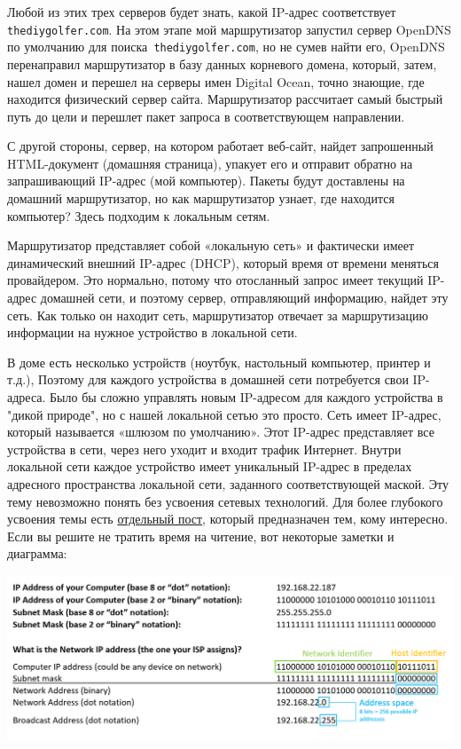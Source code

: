 \documentclass{report}
\begin{document}
Любой из этих трех серверов будет знать, какой IP-адрес соответствует
\texttt{thediygolfer.com}. На этом этапе мой маршрутизатор запустил
сервер OpenDNS по умолчанию для поиска\texttt{\ thediygolfer.com}, но не
сумев найти его, OpenDNS перенаправил маршрутизатор в базу данных
корневого домена, который, затем, нашел домен и перешел на серверы имен
Digital Ocean, точно знающие, где находится физический сервер сайта.
Маршрутизатор рассчитает самый быстрый путь до цели и перешлет пакет
запроса в соответствующем направлении.

С другой стороны, сервер, на котором работает веб-сайт, найдет
запрошенный HTML-документ (домашняя страница), упакует его и отправит
обратно на запрашивающий IP-адрес (мой компьютер). Пакеты будут
доставлены на домашний маршрутизатор, но как маршрутизатор узнает, где
находится компьютер? Здесь подходим к локальным сетям.

Маршрутизатор представляет собой «локальную сеть» и фактически имеет
динамический внешний IP-адрес (DHCP), который время от времени меняться
провайдером. Это нормально, потому что отосланный запрос имеет текущий
IP-адрес домашней сети, и поэтому сервер, отправляющий информацию,
найдет эту сеть. Как только он находит сеть, маршрутизатор отвечает за
маршрутизацию информации на нужное устройство в локальной сети.

В доме есть несколько устройств (ноутбук, настольный компьютер, принтер
и т.д.), Поэтому для каждого устройства в домашней сети потребуется свои
IP-адреса. Было бы сложно управлять новым IP-адресом для каждого
устройства в "дикой природе", но с нашей локальной сетью это просто.
Сеть имеет IP-адрес, который называется «шлюзом по умолчанию». Этот
IP-адрес представляет все устройства в сети, через него уходит и входит
трафик Интернет. Внутри локальной сети каждое устройство имеет
уникальный IP-адрес в пределах адресного пространства локальной сети,
заданного соответствующей маской. Эту тему невозможно понять без
усвоения сетевых технологий. Для более глубокого усвоения темы есть
\href{blog/2019/ip-addresses-netmasks}{отдельный пост}, который
предназначен тем, кому интересно. Если вы решите не тратить время на
читение, вот некоторые заметки и диаграмма:

\includegraphics{blog/2019/bash-essentials/ipaddresses.PNG}
\end{document}
